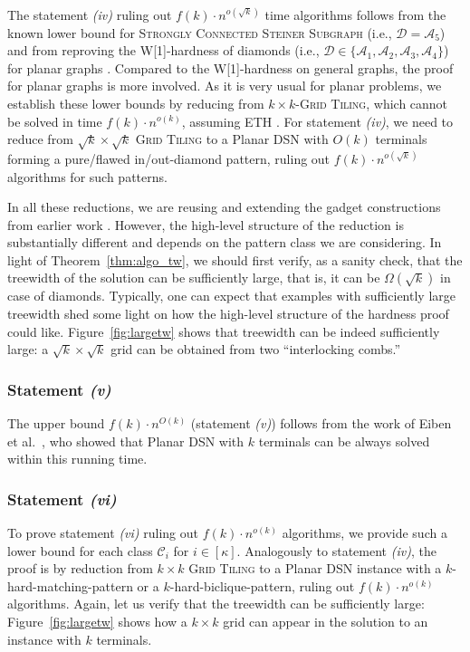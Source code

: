\documentclass[a4paper,11pt]{article}
\newcommand{\calD}{\mathcal{D}}
\theoremstyle{plain}
\newtheorem{identification rule}{Identification Rule}
\theoremstyle{definition}
\theoremstyle{remark}
\newcommand{\dsn}{{\sc Planar DSN}\xspace}
\newcommand{\oldC}{\mathcal{A}}
\newcommand{\hardbiclique}[1]{$#1$-hard-biclique-pattern}
\newcommand{\hardmatching}[1]{$#1$-hard-matching-pattern}
\begin{document}
  The statement \textit{(iv)} ruling out   $f(k) \cdot n^{o(\sqrt{k})}$ time algorithms follows from the known lower bound for \textsc{Strongly Connected Steiner Subgraph} (i.e., $\calD=\oldC_5$) \cite{ChitnisFHM20} and from reproving the W[1]-hardness of diamonds (i.e., $\calD\in \{\oldC_1,\oldC_2,\oldC_3,\oldC_4\}$) for planar graphs \cite{FeldmannM16}. Compared to the W[1]-hardness on general graphs, the proof for planar graphs is more involved. As it is very usual for planar problems, we establish these lower bounds by reducing from \textsc{$k\times k$-Grid Tiling}, which cannot be solved in time $f(k) \cdot n^{o(k)}$, assuming ETH \cite{10.5555/2815661}. For statement \textit{(iv)}, we need to reduce from \textsc{$\sqrt{k}\times \sqrt{k}$ Grid Tiling} to a \dsn with $O(k)$ terminals forming a pure/flawed in/out-diamond pattern, ruling out $f(k) \cdot n^{o(\sqrt{k})}$ algorithms for such patterns.

  In all these reductions, we are reusing and extending the gadget constructions from earlier work \cite{ChitnisFHM20}. However, the high-level structure of the reduction is substantially different and depends on the pattern class we are considering. In light of Theorem~\ref{thm:algo_tw}, we should first verify, as a sanity check, that the treewidth of the solution can be sufficiently large, that is, it can be $\Omega(\sqrt{k})$ in case of diamonds.
   Typically, one can expect that examples with sufficiently large treewidth shed some light on how the high-level structure of the hardness proof could like.
   Figure~\ref{fig:largetw} shows that treewidth can be indeed sufficiently large: a $\sqrt{k}\times\sqrt{k}$ grid can be obtained from two ``interlocking combs.''

   \subsubsection*{Statement \textit{(v)}}

 The upper bound $f(k) \cdot n^{O(k)}$ (statement \textit{(v)}) follows from the work of Eiben et al.~\cite{eiben_et_al}, who showed that \dsn with $k$ terminals can be always solved within this running time.

 \subsubsection*{Statement \textit{(vi)}}

 To prove statement \textit{(vi)} ruling out $f(k) \cdot n^{o(k)}$ algorithms, we provide such a lower bound for each class $\mathcal{C}_i$ for $i\in [\kappa]$. Analogously to statement \textit{(iv)}, the proof is by reduction from \textsc{$k\times k$ Grid Tiling} to a \dsn instance with a \hardmatching{k}
 or a \hardbiclique{k}, ruling out $f(k) \cdot n^{o(k)}$ algorithms. Again, let us verify that the treewidth can be sufficiently large: Figure~\ref{fig:largetw} shows how a $k\times k$ grid can appear in the solution to an instance with $k$ terminals.
 
\end{document}
